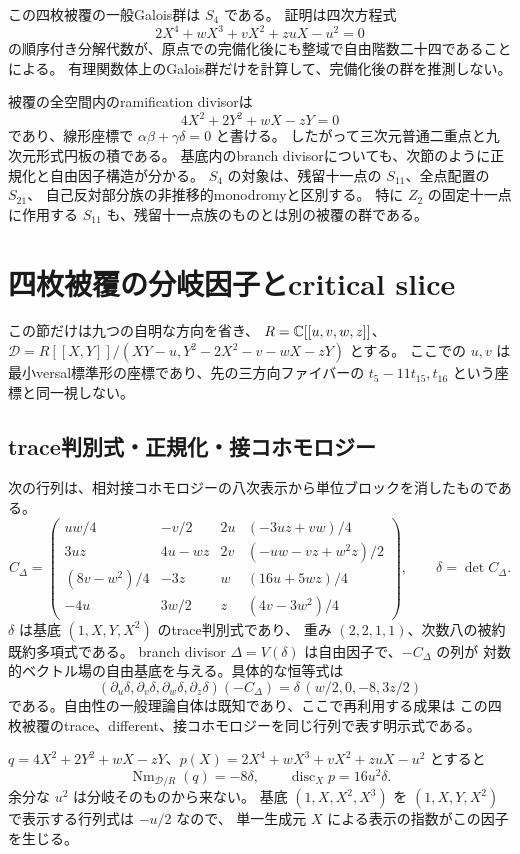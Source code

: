 この四枚被覆の一般Galois群は $S_4$ である。
証明は四次方程式
\[
 2X^4+wX^3+vX^2+zuX-u^2=0
\]
の順序付き分解代数が、原点での完備化後にも整域で自由階数二十四であることによる。
有理関数体上のGalois群だけを計算して、完備化後の群を推測しない。

被覆の全空間内のramification divisorは
\[
 4X^2+2Y^2+wX-zY=0
\]
であり、線形座標で $\alpha\beta+\gamma\delta=0$ と書ける。
したがって三次元普通二重点と九次元形式円板の積である。
基底内のbranch divisorについても、次節のように正規化と自由因子構造が分かる。
$S_4$ の対象は、残留十一点の $S_{11}$、全点配置の $S_{21}$、
自己反対部分族の非推移的monodromyと区別する。
特に $Z_2$ の固定十一点に作用する $S_{11}$ も、残留十一点族のものとは別の被覆の群である。

\section{四枚被覆の分岐因子とcritical slice}

この節だけは九つの自明な方向を省き、
$R=\mathbb C[[u,v,w,z]]$、
$\mathscr D=R[[X,Y]]/(XY-u,Y^2-2X^2-v-wX-zY)$ とする。
ここでの $u,v$ は最小versal標準形の座標であり、先の三方向ファイバーの
$t_5-11t_{15},t_{16}$ という座標と同一視しない。

\subsection{trace判別式・正規化・接コホモロジー}
次の行列は、相対接コホモロジーの八次表示から単位ブロックを消したものである。
\[
 C_\Delta=\begin{pmatrix}
 uw/4&-v/2&2u&(-3uz+vw)/4\\
 3uz&4u-wz&2v&(-uw-vz+w^2z)/2\\
 (8v-w^2)/4&-3z&w&(16u+5wz)/4\\
 -4u&3w/2&z&(4v-3w^2)/4
 \end{pmatrix},\qquad\delta=\det C_\Delta.
\]
$\delta$ は基底 $(1,X,Y,X^2)$ のtrace判別式であり、
重み $(2,2,1,1)$、次数八の被約既約多項式である。
branch divisor $\Delta=V(\delta)$ は自由因子で、$-C_\Delta$ の列が
対数的ベクトル場の自由基底を与える。具体的な恒等式は
\[
 (\partial_u\delta,\partial_v\delta,\partial_w\delta,\partial_z\delta)(-C_\Delta)
 =\delta\,(w/2,0,-8,3z/2)
\]
である。自由性の一般理論自体は既知であり、ここで再利用する成果は
この四枚被覆のtrace、different、接コホモロジーを同じ行列で表す明示式である\cite{PaperIII}。

$q=4X^2+2Y^2+wX-zY$、$p(X)=2X^4+wX^3+vX^2+zuX-u^2$ とすると
\[
 \operatorname{Nm}_{\mathscr D/R}(q)=-8\delta,\qquad
 \operatorname{disc}_X p=16u^2\delta.
\]
余分な $u^2$ は分岐そのものから来ない。
基底 $(1,X,X^2,X^3)$ を $(1,X,Y,X^2)$ で表示する行列式は $-u/2$ なので、
単一生成元 $X$ による表示の指数がこの因子を生じる。


